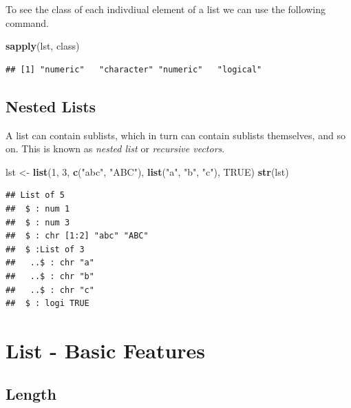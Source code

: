 \documentclass[
]{book}
\newenvironment{Shaded}{\begin{snugshade}}{\end{snugshade}}
\newcommand{\DecValTok}[1]{\textcolor[rgb]{0.00,0.00,0.81}{#1}}
\newcommand{\KeywordTok}[1]{\textcolor[rgb]{0.13,0.29,0.53}{\textbf{#1}}}
\newcommand{\NormalTok}[1]{#1}
\newcommand{\OtherTok}[1]{\textcolor[rgb]{0.56,0.35,0.01}{#1}}
\newcommand{\StringTok}[1]{\textcolor[rgb]{0.31,0.60,0.02}{#1}}
\begin{document}
To see the class of each indivdiual element of a list we can use the following command.

\begin{Shaded}
\begin{Highlighting}[]
\KeywordTok{sapply}\NormalTok{(lst, class)}
\end{Highlighting}
\end{Shaded}

\begin{verbatim}
## [1] "numeric"   "character" "numeric"   "logical"
\end{verbatim}

\hypertarget{nested-lists}{%
\subsection{Nested Lists}\label{nested-lists}}

A list can contain sublists, which in turn can contain sublists themselves, and so on. This is known as \emph{nested list} or \emph{recursive vectors}.

\begin{Shaded}
\begin{Highlighting}[]
\NormalTok{lst <-}\StringTok{ }\KeywordTok{list}\NormalTok{(}\DecValTok{1}\NormalTok{, }\DecValTok{3}\NormalTok{, }\KeywordTok{c}\NormalTok{(}\StringTok{"abc"}\NormalTok{, }\StringTok{"ABC"}\NormalTok{), }\KeywordTok{list}\NormalTok{(}\StringTok{"a"}\NormalTok{, }\StringTok{"b"}\NormalTok{, }\StringTok{"c"}\NormalTok{), }\OtherTok{TRUE}\NormalTok{)}
\KeywordTok{str}\NormalTok{(lst)}
\end{Highlighting}
\end{Shaded}

\begin{verbatim}
## List of 5
##  $ : num 1
##  $ : num 3
##  $ : chr [1:2] "abc" "ABC"
##  $ :List of 3
##   ..$ : chr "a"
##   ..$ : chr "b"
##   ..$ : chr "c"
##  $ : logi TRUE
\end{verbatim}

\hypertarget{list---basic-features}{%
\section{List - Basic Features}\label{list---basic-features}}

\hypertarget{length-2}{%
\subsection{Length}\label{length-2}}
\end{document}
